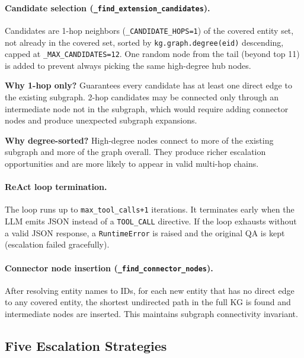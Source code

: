 \documentclass[11pt,a4paper]{article}
\begin{document}
\paragraph{Candidate selection (\texttt{\_find\_extension\_candidates}).}
Candidates are 1-hop neighbors (\texttt{\_CANDIDATE\_HOPS=1}) of the covered entity set, not already in the covered set, sorted by \texttt{kg.graph.degree(eid)} descending, capped at \texttt{\_MAX\_CANDIDATES=12}. One random node from the tail (beyond top 11) is added to prevent always picking the same high-degree hub nodes.

\textbf{Why 1-hop only?} Guarantees every candidate has at least one direct edge to the existing subgraph. 2-hop candidates may be connected only through an intermediate node not in the subgraph, which would require adding connector nodes and produce unexpected subgraph expansions.

\textbf{Why degree-sorted?} High-degree nodes connect to more of the existing subgraph and more of the graph overall. They produce richer escalation opportunities and are more likely to appear in valid multi-hop chains.

\paragraph{ReAct loop termination.} The loop runs up to \texttt{max\_tool\_calls+1} iterations. It terminates early when the LLM emits JSON instead of a \texttt{TOOL\_CALL} directive. If the loop exhausts without a valid JSON response, a \texttt{RuntimeError} is raised and the original QA is kept (escalation failed gracefully).

\paragraph{Connector node insertion (\texttt{\_find\_connector\_nodes}).} After resolving entity names to IDs, for each new entity that has no direct edge to any covered entity, the shortest undirected path in the full KG is found and intermediate nodes are inserted. This maintains subgraph connectivity invariant.

\subsection{Five Escalation Strategies}
\end{document}
